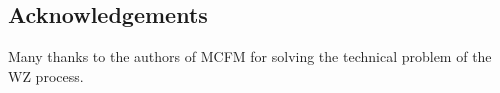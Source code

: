 \documentclass[a0,portrait]{a0poster}
\begin{document}
\begin{multicols}{2}
\nocite{*} %
\renewcommand\refname{\color{Crimson} References}


\section*{\color{Crimson} Acknowledgements}

Many thanks to the authors of MCFM for solving the technical problem of the WZ process.


\end{multicols}
\end{document}
